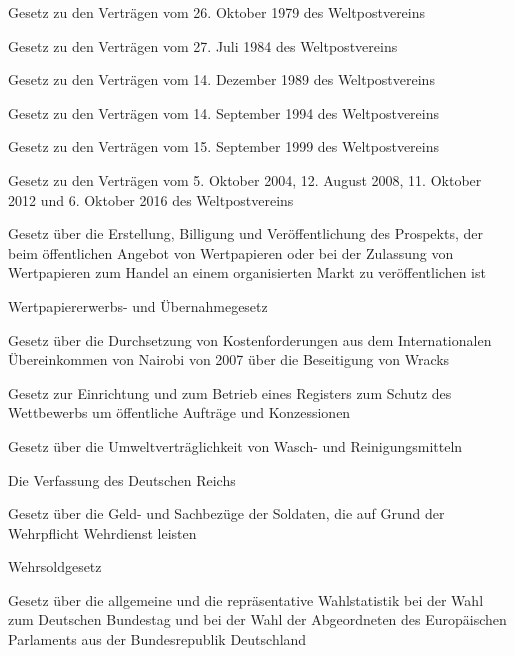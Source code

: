 \item[{WPostVtr1979G}] Gesetz zu den Verträgen vom 26. Oktober 1979 des Weltpostvereins

\item[{WPostVtr1984G}] Gesetz zu den Verträgen vom 27. Juli 1984 des Weltpostvereins

\item[{WPostVtr1989G}] Gesetz zu den Verträgen vom 14. Dezember 1989 des Weltpostvereins

\item[{WPostVtr1994G}] Gesetz zu den Verträgen vom 14. September 1994 des Weltpostvereins

\item[{WPostVtr1999G}] Gesetz zu den Verträgen vom 15. September 1999 des Weltpostvereins

\item[{WPostVtr2016G}] Gesetz zu den Verträgen vom 5. Oktober 2004, 12. August 2008, 11. Oktober 2012 und 6. Oktober 2016 des Weltpostvereins

\item[{WpPG}] Gesetz über die Erstellung, Billigung und Veröffentlichung des Prospekts, der beim öffentlichen Angebot von Wertpapieren oder bei der Zulassung von Wertpapieren zum Handel an einem organisierten Markt zu veröffentlichen ist

\item[{WpÜG}] Wertpapiererwerbs- und Übernahmegesetz

\item[{WrackBKostDG}] Gesetz über die Durchsetzung von Kostenforderungen aus dem Internationalen Übereinkommen von Nairobi von 2007 über die Beseitigung von Wracks

\item[{WRegG}] Gesetz zur Einrichtung und zum Betrieb eines Registers zum Schutz des Wettbewerbs um öffentliche Aufträge und Konzessionen

\item[{WRMG}] Gesetz über die Umweltverträglichkeit von Wasch- und Reinigungsmitteln

\item[{WRV}] Die Verfassung des Deutschen Reichs

\item[{WSG}] Gesetz über die Geld- und Sachbezüge der Soldaten, die auf Grund der Wehrpflicht Wehrdienst leisten

\item[{WSG-2020}] Wehrsoldgesetz

\item[{WStatG}] Gesetz über die allgemeine und die repräsentative Wahlstatistik bei der Wahl zum Deutschen Bundestag und bei der Wahl der Abgeordneten des Europäischen Parlaments aus der Bundesrepublik Deutschland

